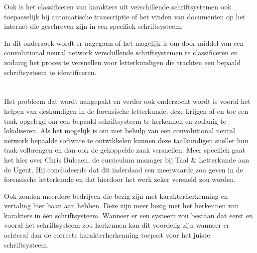 Ook is het classificeren van karakters uit verschillende schriftsystemen ook toepasselijk bij automatische transcriptie of het vinden van documenten op het internet die geschreven zijn in een specifiek schriftsysteem.

In dit onderzoek wordt er nagegaan of het mogelijk is om door middel van een convolutional neural network verschillende schriftsystemen te classificeren en zodanig het proces te versnellen voor letterkundigen die trachten een bepaald schriftsysteem te identificeren. 

 

\section{}
\label{sec:probleemstelling}


Het probleem dat wordt aangepakt en verder ook onderzocht wordt is vooral het helpen van deskundigen in de forensische letterkunde, deze krijgen af en toe een taak opgelegd om een bepaald schriftsysteem te herkennen en zodanig te lokaliseren.
Als het mogelijk is om met behulp van een convolutional neural network bepaalde software te ontwikkelen kunnen deze taalkundigen sneller hun taak volbrengen en dan ook de gekoppelde zaak versnellen.
Meer specifiek gaat het hier over Chris Bulcaen, de curriculum manager bij Taal & Letterkunde aan de Ugent.
Hij concludeerde dat dit inderdaad een meerwaarde zou geven in de forensische letterkunde en dat hierdoor het werk zeker versneld zou worden.

Ook zouden meerdere bedrijven die bezig zijn met karakterherkenning en vertaling hier baan aan hebben.
Deze zijn meer bezig met het herkennen van karakters in één schriftsysteem.
Wanneer er een systeem zou bestaan dat eerst en vooral het schriftsysteem zou herkennen kan dit voordelig zijn wanneer er achteraf dan de correcte karakterherkenning toepast voor het juiste schriftsysteem.



